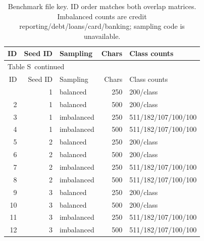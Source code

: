 \documentclass[10pt,a4paper]{article}
\renewcommand{\thetable}{S\arabic{table}}
\begin{document}
{\small
\setlength{\tabcolsep}{4pt}
\begin{longtable}{@{}rrlrl@{}}
\caption{Benchmark file key. ID order matches both overlap matrices. Imbalanced counts are credit reporting/debt/loans/card/banking; sampling code is unavailable.}\label{sup:legacy-key}\\
\toprule
ID & Seed ID & Sampling & Chars & Class counts \\
\midrule\endfirsthead
\multicolumn{5}{l}{\small Table \thetable\ continued}\\
\toprule
ID & Seed ID & Sampling & Chars & Class counts \\
\midrule\endhead
\bottomrule\endfoot
1 & 1 & balanced & 250 & 200/class \\
2 & 1 & balanced & 500 & 200/class \\
3 & 1 & imbalanced & 250 & 511/182/107/100/100 \\
4 & 1 & imbalanced & 500 & 511/182/107/100/100 \\
5 & 2 & balanced & 250 & 200/class \\
6 & 2 & balanced & 500 & 200/class \\
7 & 2 & imbalanced & 250 & 511/182/107/100/100 \\
8 & 2 & imbalanced & 500 & 511/182/107/100/100 \\
9 & 3 & balanced & 250 & 200/class \\
10 & 3 & balanced & 500 & 200/class \\
11 & 3 & imbalanced & 250 & 511/182/107/100/100 \\
12 & 3 & imbalanced & 500 & 511/182/107/100/100 \\
\end{longtable}
}
\end{document}
